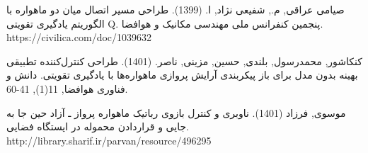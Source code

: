 \documentclass[a4paper]{article}
\newcommand{\Courses}[1]{
{
    \noindent
    \textbf{دروس مورد نیاز:}\\
    
    \centering
    \renewcommand{\arraystretch}{1.5}
    \begin{center}
    \begin{tabular}{| >{\centering}m{6em} | >{\centering}m{3em} | >{\centering}m{6em} | >{\centering}m{6em} | >{\centering}m{3em} | >{\centering\arraybackslash}m{6em} |}
         \hline
         \rowcolor{lightgray}
         \multicolumn{3}{|c|}{جبرانی}
         &
         \multicolumn{3}{|c|}{تخصصی
            \tiny
            (ارتباط موضوع پروژه با دروسی که دانشجو گذرانده یا باید بگذراند)
         }
         \\
         \hline
         \rowcolor{lightgray}
         گذرانده
         &
         نمره
         &
         باید بگذراند
         &
         گذرانده
         &
         نمره
         &
         باید بگذراند
         \\
         \hline
         &
         &
         &
         &
         &
         \\
         \hline
         &
         &
         &
         &
         &
         \\
         \hline
         &
         &
         &
         &
         &
         \\
         \hline
    \end{tabular}
    \end{center}
    \renewcommand{\arraystretch}{1}
}
}
\newcommand{\Signatures}{
{
    \renewcommand{\arraystretch}{1.5}
    
    \begin{center}
        \scriptsize
        \begin{tabular}{|m{15em}|m{15em}|m{15em}|}
            \hline
            استاد راهنما:
            &
            نظر گروه:
            &
            نظر کمیته تحصیلات تکمیلی دانشکده:
            \\
            تاریخ تحویل فرم به مدیر گروه:
            &
            &
            \\
            امضای استاد راهنما:
            &
            تاریخ جلسه گروه:
            &
            تاریخ جلسه کمیته:
            \\ 
            &
            امضای مدیر گروه:
            &
            امضای معاون تحصیلات تکمیلی:
            \\
            &
            &
            \\
            &
            &
            \\
            & &\\
            & &\\
            \hline
        \end{tabular}
    \end{center}
    \footnotesize
    توجه: فرم تعریف پروژه بایستی یک روز قبل از جلسه گروه توسط استاد راهنما تحویل مدیر گروه شود.
    \renewcommand{\arraystretch}{1}
}
}
\begin{document}
\begin{latin}
\begin{thebibliography}{1}
		صیامی عراقی, م.,  شفیعی نژاد, ا. (1399). طراحی مسیر اتصال میان دو ماهواره با الگوریتم یادگیری تقویتی Q. پنجمین کنفرانس ملی مهندسی مکانیک و هوافضا. https://civilica.com/doc/1039632
		
کنکاشور, محمدرسول, بلندی, حسین,  مزینی, ناصر. (1401). طراحی کنترل‌کننده تطبیقی بهینه بدون مدل برای باز پیکربندی آرایش پروازی ماهواره‌ها با یادگیری تقویتی. دانش و فناوری هوافضا, 11(1), 41-60.
		
		موسوی, فرزاد (1401). ناوبری و کنترل بازوی رباتیک ماهواره پرواز ـ آزاد حین جا به‌ جایی و قراردادن محموله در ایستگاه‌ فضایی. http://library.sharif.ir/parvan/resource/496295
		
	\end{thebibliography}
\end{latin}



\end{document}
